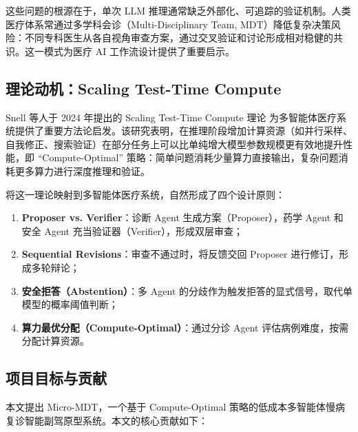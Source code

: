 \documentclass[11pt,a4paper]{ctexart}
\begin{document}
这些问题的根源在于，单次 LLM 推理通常缺乏外部化、可追踪的验证机制。人类医疗体系常通过多学科会诊（Multi-Disciplinary Team, MDT）降低复杂决策风险：不同专科医生从各自视角审查方案，通过交叉验证和讨论形成相对稳健的共识。这一模式为医疗 AI 工作流设计提供了重要启示。

\subsection{理论动机：Scaling Test-Time Compute}

Snell 等人于 2024 年提出的 Scaling Test-Time Compute 理论 \cite{snell2024scaling} 为多智能体医疗系统提供了重要方法论启发。该研究表明，在推理阶段增加计算资源（如并行采样、自我修正、搜索验证）在部分任务上可以比单纯增大模型参数规模更有效地提升性能，即 ``Compute-Optimal'' 策略：简单问题消耗少量算力直接输出，复杂问题消耗更多算力进行深度推理和验证。

将这一理论映射到多智能体医疗系统，自然形成了四个设计原则：

\begin{enumerate}[label=(\arabic*),leftmargin=2em]
    \item \textbf{Proposer vs. Verifier}：诊断 Agent 生成方案（Proposer），药学 Agent 和安全 Agent 充当验证器（Verifier），形成双层审查；
    \item \textbf{Sequential Revisions}：审查不通过时，将反馈交回 Proposer 进行修订，形成多轮辩论；
    \item \textbf{安全拒答（Abstention）}：多 Agent 的分歧作为触发拒答的显式信号，取代单模型的概率阈值判断；
    \item \textbf{算力最优分配（Compute-Optimal）}：通过分诊 Agent 评估病例难度，按需分配计算资源。
\end{enumerate}

\subsection{项目目标与贡献}

本文提出 Micro-MDT，一个基于 Compute-Optimal 策略的低成本多智能体慢病复诊智能副驾原型系统。本文的核心贡献如下：
\end{document}
